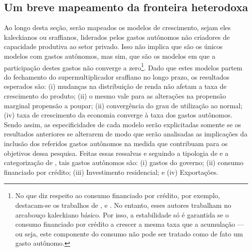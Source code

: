 \subsection{Um breve mapeamento da fronteira heterodoxa}
\label{Hibridos}


Ao longo desta seção, serão mapeados os modelos de crescimento, 
sejam eles kaleckianos ou sraffianos, liderados pelos gastos autônomos não criadores de capacidade produtiva ao setor privado. Isso não implica que são os únicos modelos com gastos autônomos, mas sim, que são os modelos em que a participação destes gastos não converge a zero\footnote{
	No que diz respeito ao consumo financiado por crédito, por exemplo, destacam-se os trabalhos de \textcite{dutt_maturity_2006}, \textcite{palley_inside_2010} e \textcite{hein_finance-dominated_2012}.
	No entanto, esses autores trabalham no arcabouço kaleckiano básico. Por isso, a estabilidade só é garantida se o consumo financiado por crédito a crescer a mesma taxa que a acumulação --- ou seja, este componente do consumo não pode ser tratado como de fato um gasto autônomo.
}.
Dado que estes modelos partem do fechamento do supermultiplicador sraffiano no longo prazo, os resultados esperados são: (i) mudanças na distribuição de renda não afetam a taxa de crescimento do produto; (ii) o mesmo vale para as alterações na propensão marginal propensão a poupar; (ii) convergência do grau de utilização ao normal; (iv) taxa de crescimento da economia converge à taxa dos gastos autônomos.
Sendo assim, as especificidades de cada modelo serão explicitadas somente se os resultados anteriores se alterarem de modo que serão analisadas as implicações da inclusão dos referidos gastos autônomos na medida que contribuam para os objetivos dessa pesquisa.
Feitas essas ressalvas e seguindo a tipologia de \textcite{cesaratto_technical_2003} e a categorização de \textcite{serrano_sraffian_1995}, tais gastos autônomos são: (i) gastos do governo; (ii) consumo financiado por crédito; (iii) Investimento residencial; e (iv) Exportações.


